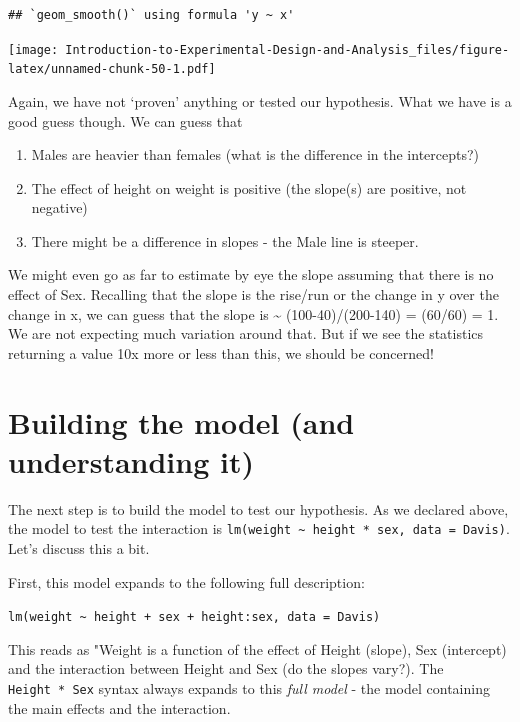 \documentclass[
]{book}
\providecommand{\tightlist}{%
  \setlength{\itemsep}{0pt}\setlength{\parskip}{0pt}}
\begin{document}
\begin{verbatim}
## `geom_smooth()` using formula 'y ~ x'
\end{verbatim}

\texttt{[image: Introduction-to-Experimental-Design-and-Analysis\_files/figure-latex/unnamed-chunk-50-1.pdf]}

Again, we have not `proven' anything or tested our hypothesis. What we have is a good guess though. We can guess that

\begin{enumerate}
\def\labelenumi{\arabic{enumi}.}
\tightlist
\item
  Males are heavier than females (what is the difference in the intercepts?)
\item
  The effect of height on weight is positive (the slope(s) are positive, not negative)
\item
  There might be a difference in slopes - the Male line is steeper.
\end{enumerate}

We might even go as far to estimate by eye the slope assuming that there is no effect of Sex. Recalling that the slope is the rise/run or the change in y over the change in x, we can guess that the slope is \textasciitilde{} (100-40)/(200-140) = (60/60) = 1. We are not expecting much variation around that. But if we see the statistics returning a value 10x more or less than this, we should be concerned!

\hypertarget{building-the-model-and-understanding-it}{%
\section{Building the model (and understanding it)}\label{building-the-model-and-understanding-it}}

The next step is to build the model to test our hypothesis. As we declared above, the model to test the interaction is \texttt{lm(weight\ \textasciitilde{}\ height\ *\ sex,\ data\ =\ Davis)}. Let's discuss this a bit.

First, this model expands to the following full description:

\texttt{lm(weight\ \textasciitilde{}\ height\ +\ sex\ +\ height:sex,\ data\ =\ Davis)}

This reads as "Weight is a function of the effect of Height (slope), Sex (intercept) and the interaction between Height and Sex (do the slopes vary?). The \texttt{Height\ *\ Sex} syntax always expands to this \emph{full model} - the model containing the main effects and the interaction.
\end{document}
